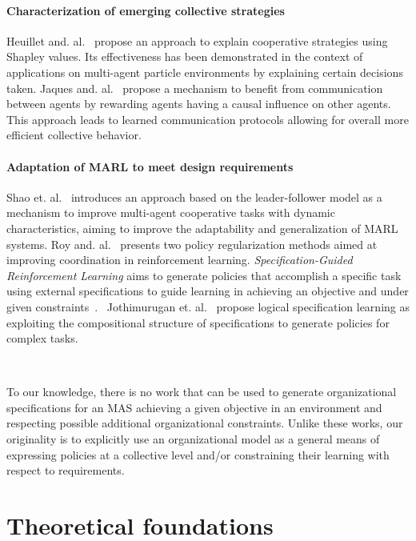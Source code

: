 \documentclass{ecai}
\begin{document}
\paragraph{\textbf{Characterization of emerging collective strategies}}
%
Heuillet and. al.~\cite{Heuillet2022} propose an approach to explain cooperative strategies using Shapley values. Its effectiveness has been demonstrated in the context of applications on multi-agent particle environments by explaining certain decisions taken.
%
Jaques and. al.~\cite{Jaques2019} propose a mechanism to benefit from communication between agents by rewarding agents having a causal influence on other agents. This approach leads to learned communication protocols allowing for overall more efficient collective behavior.

\paragraph{\textbf{Adaptation of MARL to meet design requirements}}
%
Shao et. al.~\cite{Shao2022} introduces an approach based on the leader-follower model as a mechanism to improve multi-agent cooperative tasks with dynamic characteristics, aiming to improve the adaptability and generalization of MARL systems.
%
Roy and. al.~\cite{Roy2020} presents two policy regularization methods aimed at improving coordination in reinforcement learning.
\emph{Specification-Guided Reinforcement Learning} aims to generate policies that accomplish a specific task using external specifications to guide learning in achieving an objective and under given constraints~\cite{Bansal2022}.%
%
~Jothimurugan et. al.~\cite{Jothimurugan2021} propose logical specification learning as exploiting the compositional structure of specifications to generate policies for complex tasks.

\

To our knowledge, there is no work that can be used to generate organizational specifications for an MAS achieving a given objective in an environment and respecting possible additional organizational constraints.
Unlike these works, our originality is to explicitly use an organizational model as a general means of expressing policies at a collective level and/or constraining their learning with respect to requirements.

\section{Theoretical foundations}
\end{document}

